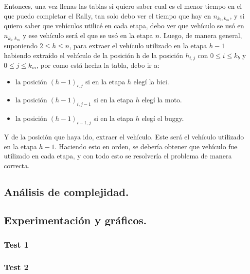 	Entonces, una vez llenas las tablas si quiero saber cual es el menor tiempo en el que puedo completar el Rally, tan solo debo ver el tiempo que hay en $n_{k_{b},k_{m}}$, y si quiero saber que vehículos utilicé en cada etapa, debo ver que vehículo se usó en $n_{k_{b},k_{m}}$ y ese vehículo será el que se usó en la etapa $n$. Luego, de manera general, suponiendo $2 \leq h \leq n$, para extraer el vehículo utilizado en la etapa $h-1$ habiendo extraído el vehículo de la posición h de la posición $h_{i,j}$ con $0\leq i \leq k_{b}$ y $0\leq j \leq k_{m}$, por como está hecha la tabla, debo ir a:
	
\begin{itemize}
	\item la posición $(h-1)_{i,j}$ si en la etapa $h$ elegí la bici.
	\item la posición $(h-1)_{i,j-1}$ si en la etapa $h$ elegí la moto.
	\item la posición $(h-1)_{i-1,j}$ si en la etapa $h$ elegí el buggy.
\end{itemize}			

	 Y de la posición que haya ido, extraer el vehículo. Este será el vehículo utilizado en la etapa $h-1$. Haciendo esto en orden, se debería obtener que vehículo fue utilizado en cada etapa, y con todo esto se resolvería el problema de manera correcta.
 
\vspace*{0.6cm}


\subsection{Análisis de complejidad.}

\vspace*{0.3cm}


\vspace*{0.6cm}
\subsection{Experimentación y gráficos.}

\vspace*{0.3cm}

\subsubsection{Test 1}

\vspace*{0.3cm}

\vspace*{0.6cm}
\subsubsection{Test 2}

\vspace*{0.3cm}

